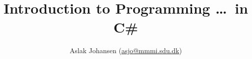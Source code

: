 \documentclass[a4paper, oneside]{memoir}
\begin{document}
\title{Introduction to Programming \ldots\ in C\#}
\author{Aslak Johansen (\href{mailto:asjo@mmmi.sdu.dk}{asjo@mmmi.sdu.dk})}
\maketitle
\tableofcontents












\end{document}
